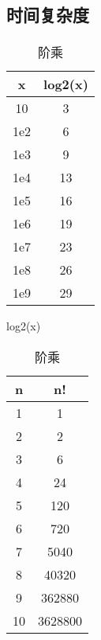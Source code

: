 ﻿\subsection{时间复杂度}
	\paragraph{}
	\begin{table}[!htbp]
	\centering
	\begin{minipage}{.5\linewidth}  		
		\begin{tabular}{|c|c|}
			\hline
			x & log2(x) \\
			\hline
			10 & 3 \\
			\hline
			1e2 & 6 \\
			\hline
			1e3 & 9 \\
			\hline
			1e4 & 13 \\
			\hline
			1e5 & 16 \\
			\hline
			1e6 & 19 \\
			\hline
			1e7 & 23 \\
			\hline
			1e8 & 26 \\
			\hline
			1e9 & 29 \\
			\hline
		\end{tabular}
		\caption{log2(x)}
	\end{minipage}\begin{minipage}{.5\linewidth} 		
		\begin{tabular}{|c|c|}
			\hline
			n & n! \\
			\hline
			1 & 1 \\
			\hline
			2 & 2 \\
			\hline
			3 & 6 \\
			\hline
			4 & 24 \\
			\hline
			5 & 120 \\
			\hline
			6 & 720 \\
			\hline
			7 & 5040 \\
			\hline
			8 & 40320 \\	
			\hline
			9 & 362880 \\
			\hline
			10 & 3628800 \\
			\hline
		\end{tabular}
		\caption{阶乘}
	\end{minipage}
	\end{table}	
